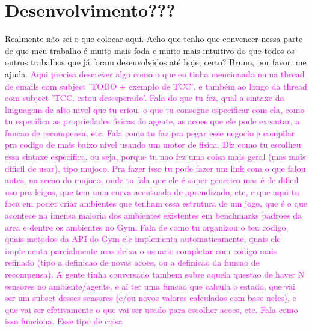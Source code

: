 \documentclass[cic,tc]{iiufrgs}
\newcommand\bruno[1]{\textcolor{magenta}{#1}}
\begin{document}
\chapter{Desenvolvimento???}
Realmente não sei o que colocar aqui. Acho que tenho que convencer nessa parte de que meu trabalho é muito mais foda e muito
mais intuitivo do que todos os outros trabalhos que já foram desenvolvidos até hoje, certo?
Bruno, por favor, me ajuda.
\bruno{Aqui precisa descrever algo como o que eu tinha mencionado numa thread de emails com subject 'TODO + exemplo de TCC', e também ao longo da thread com subject 'TCC. estou desesperado'. Fala do que tu fez, qual a sintaxe da linguagem de alto nivel que tu criou, o que tu consegue especificar com ela, como tu especifica as propriedades fisicas do agente, as acoes que ele pode executar, a funcao de recompensa, etc. Fala como tu faz pra pegar esse negocio e compilar pra codigo de mais baixo nivel usando um motor de fisica. Diz como tu escolheu essa sintaxe especifica, ou seja, porque tu nao fez uma coisa mais geral (mas mais dificil de usar), tipo mujoco. Pra fazer isso tu pode fazer um link com o que falou antes, na secao do mujoco, onde tu fala que ele é super generico mas é de dificil uso pra leigos, que tem uma curva acentuada de aprendizado, etc, e que aqui tu foca em poder criar ambientes que tenham essa estrutura de um jogo, que é o que acontece na imensa maioria dos ambientes existentes em benchmarks padroes da area e dentre os ambientes no Gym. Fala de como tu organizou o teu codigo, quais metodos da API do Gym ele implementa automaticamente, quais ele implementa parcialmente mas deixa o usuario completar com codigo mais refinado (tipo a definicao de novas acoes, ou a definicao da funcao de recompensa). A gente tinha conversado tambem sobre aquela questao de haver N sensores no ambiente/agente, e aí ter uma funcao que calcula o estado, que vai ser um subset desses sensores (e/ou novos valores calculados com base neles), e que vai ser efetivamente o que vai ser usado para escolher acoes, etc. Fala como isso funciona. Esse tipo de coisa}
\end{document}
